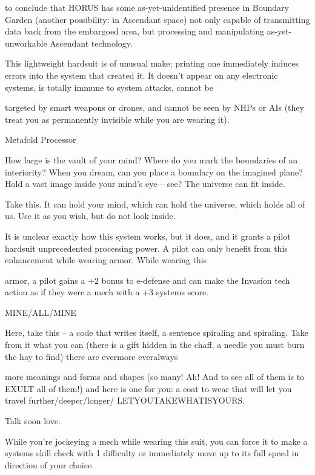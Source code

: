 to conclude that HORUS has some as-yet-unidentified presence in Boundary Garden (another possibility:  
in Ascendant space) not only capable of transmitting data back from the embargoed area, but processing  
and manipulating as-yet-unworkable Ascendant technology.     

This lightweight hardsuit is of unusual make; printing one immediately induces errors into the system that  
created it. It doesn’t appear on any electronic systems, is totally immune to system attacks, cannot be  

targeted by smart weapons or drones, and cannot be seen by NHPs or AIs (they treat you as permanently  
invisible while you are wearing it).
 

Metafold Processor  

                                                                                                                 


How large is the vault of your mind? Where do you mark the boundaries of an interiority? When you dream,  
can you place a boundary on the imagined plane? Hold a vast image inside your mind’s eye -- see? The  
universe can fit inside.  

Take this. It can hold your mind, which can hold the universe, which holds all of us. Use it as you wish, but  
do not look inside.   

It is unclear exactly how this system works, but it does, and it grants a pilot hardsuit unprecedented  
processing power. A pilot can only benefit from this enhancement while wearing armor. While wearing this  

armor, a pilot gains a +2 bonus to e-defense and can make the Invasion tech action as if they were a mech  
with a +3 systems score.
 

MINE/ALL/MINE
 
Here, take this -- a code that writes itself, a sentence spiraling and spiraling. Take from it what you can  
(there is a gift hidden in the chaff, a needle you must burn the hay to find) there are evermore everalways  

more meanings and forms and shapes (so many! Ah! And to see all of them is to EXULT all of them!) and  
here is one for you: a coat to wear that will let you travel further/deeper/longer/ 
LETYOUTAKEWHATISYOURS.  

Talk soon love.   

While you’re jockeying a mech while wearing this suit, you can force it to make a systems skill check with  
1 difficulty or immediately move up to its full speed in direction of your choice.
 

